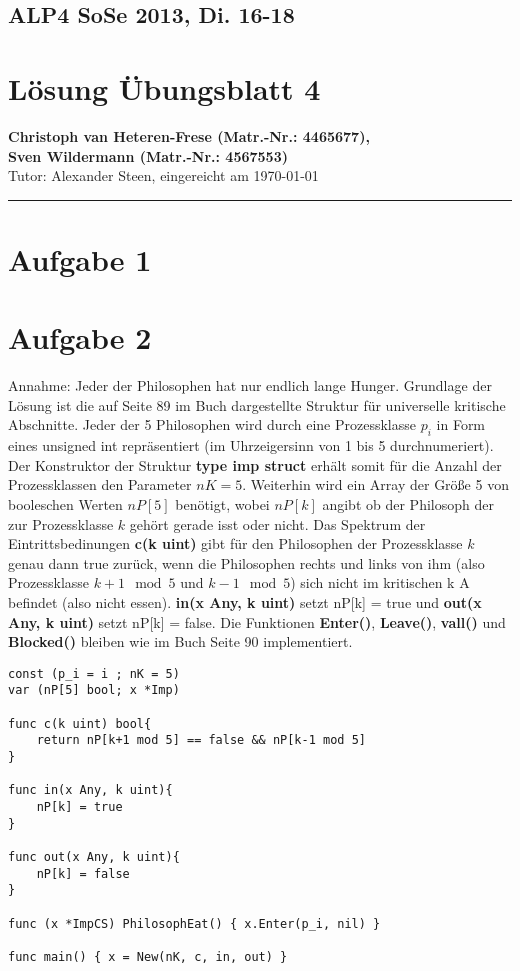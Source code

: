 \documentclass[11pt,a4paper,DIV=10,]{scrartcl}
\begin{document}
\subsection*{ALP4 SoSe 2013, Di. 16-18}
\section*{Lösung Übungsblatt 4}
\textbf{Christoph van Heteren-Frese (Matr.-Nr.: 4465677), \\ Sven Wildermann (Matr.-Nr.: 4567553)}\\
Tutor: Alexander Steen, eingereicht am \today\\
\hrule
\section*{Aufgabe 1}


\section*{Aufgabe 2}
Annahme: Jeder der Philosophen hat nur endlich lange Hunger. 
Grundlage der Lösung ist die auf Seite 89 im Buch dargestellte Struktur für universelle kritische Abschnitte. Jeder der 5 Philosophen wird durch eine Prozessklasse $p_i$ in Form eines unsigned int repräsentiert (im Uhrzeigersinn von 1 bis 5 durchnumeriert). Der Konstruktor der Struktur \textbf{type imp struct} erhält somit für die Anzahl der Prozessklassen den Parameter $nK=5$. Weiterhin wird ein Array der Größe 5 von booleschen Werten $nP[5]$ benötigt, wobei $nP[k]$ angibt ob der Philosoph der zur Prozessklasse $k$ gehört gerade isst oder nicht.   Das Spektrum der Eintrittsbedinungen \textbf{c(k uint)} gibt für den Philosophen der Prozessklasse $k$ genau dann true zurück, wenn die Philosophen rechts und links von ihm (also Prozessklasse $k+1 \mod 5$ und $k-1 \mod 5$) sich nicht im kritischen k A befindet (also nicht essen). \textbf{in(x Any, k uint)} setzt nP[k] = true und \textbf{out(x Any, k uint)} setzt nP[k] = false. Die Funktionen \textbf{Enter()}, \textbf{Leave()}, \textbf{vall()} und \textbf{Blocked()} bleiben wie im Buch Seite 90 implementiert.

\begin{lstlisting} 
const (p_i = i ; nK = 5)
var (nP[5] bool; x *Imp)

func c(k uint) bool{
	return nP[k+1 mod 5] == false && nP[k-1 mod 5]
}

func in(x Any, k uint){
	nP[k] = true	
}

func out(x Any, k uint){
	nP[k] = false
}

func (x *ImpCS) PhilosophEat() { x.Enter(p_i, nil) }

func main() { x = New(nK, c, in, out) }


\end{lstlisting}
\end{document}
